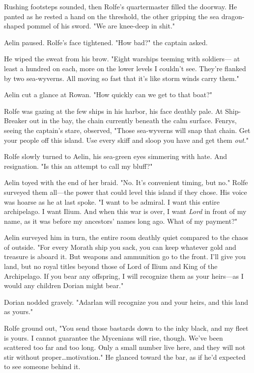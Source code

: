Rushing footsteps sounded, then Rolfe's quartermaster filled the doorway.
He panted as he rested a hand on the threshold, the other gripping the sea dragon-shaped pommel of his sword.
"We are knee-deep in shit."

Aelin paused.
Rolfe's face tightened.
"How bad?"
the captain asked.

He wiped the sweat from his brow.
"Eight warships teeming with soldiers--- at least a hundred on each, more on the lower levels I couldn't see.
They're flanked by two sea-wyverns.
All moving so fast that it's like storm winds carry them."

Aelin cut a glance at Rowan.
"How quickly can we get to that boat?"

Rolfe was gazing at the few ships in his harbor, his face deathly pale.
At Ship-Breaker out in the bay, the chain currently beneath the calm surface.
Fenrys, seeing the captain's stare, observed, "Those sea-wyverns will snap that chain.
Get your people off this island.
Use every skiff and sloop you have and get them \emph{out}."

Rolfe slowly turned to Aelin, his sea-green eyes simmering with hate.
And resignation.
"Is this an attempt to call my bluff?"

Aelin toyed with the end of her braid.
"No.
It's convenient timing, but no."
Rolfe surveyed them all---the power that could level this island if they chose.
His voice was hoarse as he at last spoke.
"I want to be admiral.
I want this entire archipelago.
I want Ilium.
And when this war is over, I want \emph{Lord} in front of my name, as it was before my ancestors' names long ago.
What of my payment?"

Aelin surveyed him in turn, the entire room deathly quiet compared to the chaos of outside.
"For every Morath ship you sack, you can keep whatever gold and treasure is aboard it.
But weapons and ammunition go to the front.
I'll give you land, but no royal titles beyond those of Lord of Ilium and King of the Archipelago.
If you bear any offspring, I will recognize them as your heirs---as I would any children Dorian might bear."

Dorian nodded gravely.
"Adarlan will recognize you and your heirs, and this land as yours."

Rolfe ground out, "You send those bastards down to the inky black, and my fleet is yours.
I cannot guarantee the Mycenians will rise, though.
We've been scattered too far and too long.
Only a small number live here, and they will not stir without proper\ldots motivation."
He glanced toward the bar, as if he'd expected to see someone behind it.

